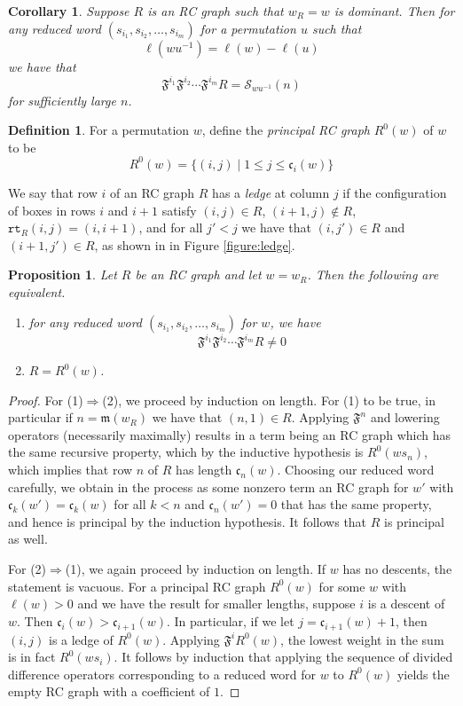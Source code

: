 \documentclass{amsart}
\newtheorem{corollary}[lemma]{Corollary}
\newtheorem{proposition}[lemma]{Proposition}
\theoremstyle{definition}
\newtheorem{definition}[lemma]{Definition}
\theoremstyle{remark}
\numberwithin{equation}{subsection}
\newcommand{\wof}[1]{w_{#1}}
\newcommand{\rcdd}{\mathfrak{F}}
\newcommand{\rtt}{\mathtt{rt}}
\newcommand{\code}{\mathfrak{c}}
\newcommand{\maxd}{\mathfrak{m}}
\begin{document}
\begin{corollary} \label{corollary:generateschubert}
Suppose $R$ is an RC graph such that $\wof{R} = w$ is dominant. Then for any reduced word $(s_{i_1}, s_{i_2}, \ldots, s_{i_m})$ for a permutation $u$ such that
$$\ell(wu^{-1}) = \ell(w) - \ell(u)$$
we have that
$$\rcdd^{i_1}\rcdd^{i_2}\cdots \rcdd^{i_m}R = \mathcal{S}_{wu^{-1}}(n)$$
for sufficiently large $n$.
\end{corollary}


\begin{definition}
For a permutation $w$, define the \emph{principal RC graph} $R^0(w)$ of $w$ to be
$$R^0(w) = \{(i,j)\mid 1\leq j\leq \code_i(w)\}$$

We say that row $i$ of an RC graph $R$ has a \emph{ledge} at column $j$ if the configuration of boxes in rows $i$ and $i+1$ satisfy $(i,j)\in R$, $(i+1,j)\notin  R$, $\rtt_R(i,j)=(i,i+1)$, and for all $j' < j$ we have that $(i,j')\in R$ and $(i+1,j')\in R$, as shown in in Figure \ref{figure:ledge}.
\end{definition}

\begin{proposition} \label{proposition:divdiffprincipal}
Let $R$ be an RC graph and let $w=\wof{R}$. Then the following are equivalent.
\begin{enumerate}
\item for any reduced word $(s_{i_1}, s_{i_2}, \ldots, s_{i_m})$ for $w$, we have
$$\rcdd^{i_1}\rcdd^{i_2}\cdots \rcdd^{i_m}R \neq 0$$

\item $R = R^0(w)$.
\end{enumerate}
\end{proposition}
\begin{proof}
For (1)$\Rightarrow$(2), we proceed by induction on length. For (1) to be true, in particular if $n=\maxd(\wof{R})$ we have that $(n,1)\in R$. Applying $\rcdd^n$ and lowering operators (necessarily maximally) results in a term being an RC graph which has the same recursive property, which by the inductive hypothesis is $R^0(ws_n)$, which implies that row $n$ of $R$ has length $\code_n(w)$. Choosing our reduced word carefully, we obtain in the process as some nonzero term an RC graph for $w'$ with $\code_k(w') = \code_k(w)$ for all $k<n$ and $\code_n(w')=0$ that has the same property, and hence is principal by the induction hypothesis. It follows that $R$ is principal as well.

For (2)$\Rightarrow$(1), we again proceed by induction on length. If $w$ has no descents, the statement is vacuous. For a principal RC graph $R^0(w)$ for some $w$ with $\ell(w)>0$ and we have the result for smaller lengths, suppose $i$ is a descent of $w$. Then $\code_i(w) > \code_{i+1}(w)$. In particular, if we let $j = \code_{i+1}(w) + 1$, then $(i,j)$ is a ledge of $R^0(w)$. Applying $\rcdd^iR^0(w)$, the lowest weight in the sum is in fact $R^0(ws_i)$. It follows by induction that applying the sequence of divided difference operators corresponding to a reduced word for $w$ to $R^0(w)$ yields the empty RC graph with a coefficient of $1$.
\end{proof}
\end{document}
